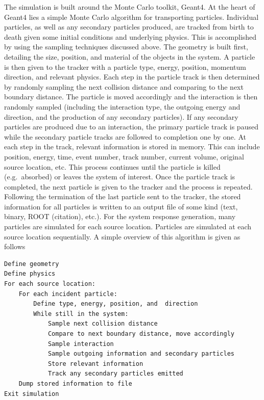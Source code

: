 \documentclass[10pt]{article}
\begin{document}
The simulation is built around the Monte Carlo toolkit, Geant4. At the heart of Geant4 lies a simple Monte Carlo algorithm for transporting particles. Individual particles, as well as any secondary particles produced, are tracked from birth to death given some initial conditions and underlying physics. This is accomplished by using the sampling techniques discussed above. The geometry is built first, detailing the size, position, and material of the objects in the system. A particle is then given to the tracker with a particle type, energy, position, momentum direction, and relevant physics. Each step in the particle track is then determined by randomly sampling the next collision distance and comparing to the next boundary distance. The particle is moved accordingly and the interaction is then randomly sampled (including the interaction type, the outgoing energy and direction, and the production of any secondary particles). If any secondary particles are produced due to an interaction, the primary particle track is paused while the secondary particle tracks are followed to completion one by one. At each step in the track, relevant information is stored in memory. This can include position, energy, time, event number, track number, current volume, original source location, etc. This process continues until the particle is killed (e.g.~absorbed) or leaves the system of interest. Once the particle track is completed, the next particle is given to the tracker and the process is repeated. Following the termination of the last particle sent to the tracker, the stored information for all particles is written to an output file of some kind (text, binary, ROOT (citation), etc.). For the system response generation, many particles are simulated for each source location. Particles are simulated at each source location sequentially. A simple overview of this algorithm is given as follows

\begin{lstlisting}
Define geometry
Define physics
For each source location:
	For each incident particle:
		Define type, energy, position, and  direction
		While still in the system:
			Sample next collision distance
			Compare to next boundary distance, move accordingly
			Sample interaction
			Sample outgoing information and secondary particles
			Store relevant information
			Track any secondary particles emitted
	Dump stored information to file 
Exit simulation
\end{lstlisting}
\end{document}
